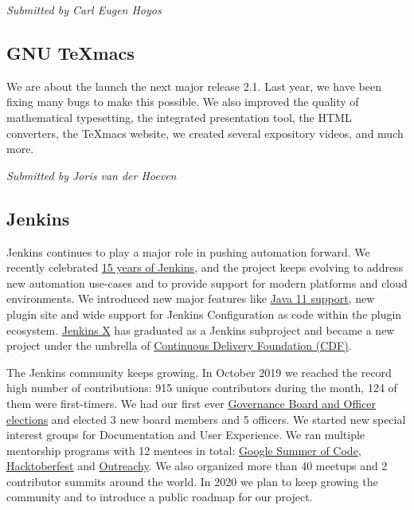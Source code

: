 \documentclass[a4paper]{report}
\begin{document}
{\em Submitted by Carl Eugen Hoyos}

\subsection{GNU TeXmacs}

We are about the launch the next major release 2.1.  Last year, we have
been fixing many bugs to make this possible.  We also improved the
quality of mathematical typesetting, the integrated presentation tool,
the HTML converters, the TeXmacs website, we created several expository
videos, and much more.

{\em Submitted by Joris van der Hoeven}

\subsection{Jenkins}

Jenkins continues to play a major role in pushing automation forward. We
recently celebrated
\href{https://cd.foundation/announcement/2019/08/14/jenkins-celebrates-15-years/}{15
years of Jenkins}, and the project keeps evolving to address new
automation use-cases and to provide support for modern platforms and
cloud environments. We introduced new major features like
\href{https://jenkins.io/blog/2019/03/11/let-s-celebrate-java-11-support/}{Java
11 support}, new plugin site and wide support for Jenkins Configuration
as code within the plugin ecosystem.
\href{https://jenkins-x.io/}{Jenkins X} has graduated as a Jenkins
subproject and became a new project under the umbrella of
\href{https://cd.foundation/}{Continuous Delivery Foundation (CDF)}.

The Jenkins community keeps growing. In October 2019 we reached the
record high number of contributions: 915 unique contributors during the
month, 124 of them were first-timers. We had our first ever
\href{https://jenkins.io/blog/2019/12/16/board-election-results/}{Governance
Board and Officer elections} and elected 3 new board members and 5
officers. We started new special interest groups for Documentation and
User Experience. We ran multiple mentorship programs with 12 mentees in
total: \href{https://jenkins.io/projects/gsoc/2019/}{Google Summer of
Code}, \href{https://jenkins.io/events/hacktoberfest/}{Hacktoberfest}
and
\href{https://jenkins.io/blog/2019/09/23/outreachy-audit-log-release/}{Outreachy}.
We also organized more than 40 meetups and 2 contributor summits around
the world. In 2020 we plan to keep growing the community and to
introduce a public roadmap for our project.
\end{document}
